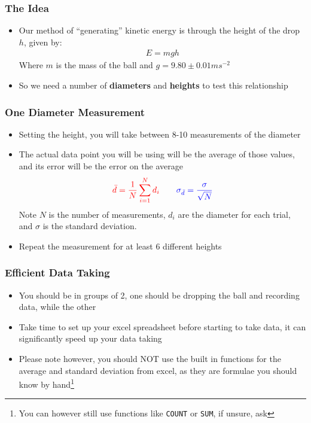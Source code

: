 \documentclass[aspectratio=169]{beamer}
\begin{document}
\begin{frame}
  \frametitle{The Idea}
  \begin{itemize}
  \item Our method of ``generating'' kinetic energy is through the height of the drop $h$, given by:
    \begin{align*}
      E=mgh
    \end{align*}
    Where $m$ is the mass of the ball and $g=9.80\pm0.01\unit{ms^{-2}}$
  \item So we need a number of \textbf{diameters} and \textbf{heights} to test this relationship
  \end{itemize}
\end{frame}

\begin{frame}
  \frametitle{One Diameter Measurement}
  \begin{itemize}
  \item Setting the height, you will take between 8-10 measurements of the diameter
  \item The actual data point you will be using will be the {\color{red}average} of those values, and its error will be the {\color{blue}error on the average}
    \begin{gather*}
      {\color{red}\bar{d}=\frac1N\sum_{i=1}^Nd_i}\qquad
      {\color{blue}\sigma_{\bar{d}}=\frac{\sigma}{\sqrt{N}}}
    \end{gather*}
    Note $N$ is the number of measurements, $d_i$ are the diameter for each trial, and $\sigma$ is the standard deviation.
  \item Repeat the measurement for at least 6 different heights
  \end{itemize}
\end{frame}

\begin{frame}
  \frametitle{Efficient Data Taking}
  \begin{itemize}
  \item You should be in groups of 2, one should be dropping the ball and recording data, while the other
  \item Take time to set up your excel spreadsheet before starting to take data, it can significantly speed up your data taking
  \item Please note however, you should NOT use the built in functions for the average and standard deviation from excel, as they are formulae you should know by hand\footnote{You can however still use functions like \texttt{COUNT} or \texttt{SUM}, if unsure, ask}
  \end{itemize}
\end{frame}
\end{document}
